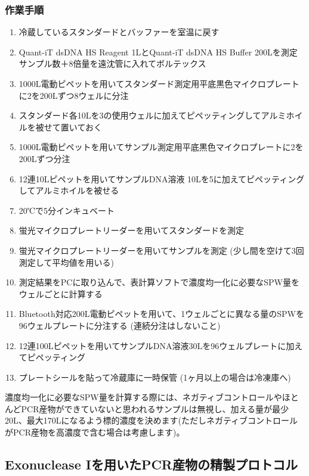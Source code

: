 \documentclass[titlepage,10pt,a4paper,uplatex]{jsbook}
\begin{document}
\subsubsection{作業手順}
\begin{enumerate}
\item 冷蔵しているスタンダードとバッファーを室温に戻す
\item Quant-iT dsDNA HS Reagent 1{\textmu}LとQuant-iT dsDNA HS Buffer 200{\textmu}Lを測定サンプル数＋8倍量を遠沈管に入れてボルテックス
\item 1000{\textmu}L電動ピペットを用いてスタンダード測定用平底黒色マイクロプレートに2を200{\textmu}Lずつ8ウェルに分注
\item スタンダード各10{\textmu}Lを3の使用ウェルに加えてピペッティングしてアルミホイルを被せて置いておく
\item 1000{\textmu}L電動ピペットを用いてサンプル測定用平底黒色マイクロプレートに2を200{\textmu}Lずつ分注
\item 12連10{\textmu}Lピペットを用いてサンプルDNA溶液 10{\textmu}Lを5に加えてピペッティングしてアルミホイルを被せる
\item 20℃で5分インキュベート
\item 蛍光マイクロプレートリーダーを用いてスタンダードを測定
\item 蛍光マイクロプレートリーダーを用いてサンプルを測定 (少し間を空けて3回測定して平均値を用いる)
\item 測定結果をPCに取り込んで、表計算ソフトで濃度均一化に必要なSPW量をウェルごとに計算する
\item Bluetooth対応200{\textmu}L電動ピペットを用いて、1ウェルごとに異なる量のSPWを96ウェルプレートに分注する (連続分注はしないこと)
\item 12連100{\textmu}Lピペットを用いてサンプルDNA溶液30{\textmu}Lを96ウェルプレートに加えてピペッティング
\item プレートシールを貼って冷蔵庫に一時保管 (1ヶ月以上の場合は冷凍庫へ)
\end{enumerate}

濃度均一化に必要なSPW量を計算する際には、ネガティブコントロールやほとんどPCR産物ができていないと思われるサンプルは無視し、加える量が最少20{\textmu}L、最大170{\textmu}Lになるよう標的濃度を決めます(ただしネガティブコントロールがPCR産物を高濃度で含む場合は考慮します)。

\subsection{Exonuclease Iを用いたPCR産物の精製プロトコル}
\end{document}
